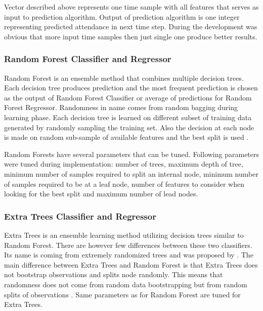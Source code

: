 \documentclass{article}
\begin{document}
Vector described above represents one time sample with all features that serves as input to prediction algorithm. Output of prediction algorithm is one integer representing predicted attendance in next time step. During the development was obvious that more input time samples then just single one produce better results. 

\subsubsection{Random Forest Classifier and Regressor}
Random Forest is an ensemble method that combines multiple decision trees. Each decision tree produces prediction and the most frequent prediction is chosen as the output of Random Forest Classifier or average of predictions for Random Forest Regressor. Randomness in name comes from random bagging during learning phase. Each decision tree is learned on different subset of training data generated by randomly sampling the training set. Also the decision at each node is made on random sub-sample of available features and the best split is used \citep{yiu2019randomforest} \citep{wiki2019randomforest}.

Random Forests have several parameters that can be tuned. Following parameters were tuned during implementation: number of trees, maximum depth of tree, minimum number of samples required to split an internal node, minimum number of samples required to be at a leaf node, number of features to consider when looking for the best split and maximum number of lead nodes. 

\subsubsection{Extra Trees Classifier and Regressor}
Extra Trees is an ensemble learning method utilizing decision trees similar to Random Forest. There are however few differences between these two classifiers. Its name is coming from extremely randomized trees and was proposed by \citep{geurts206extratree}. The main difference between Extra Trees and Random Forest is that Extra Trees does not bootstrap observations and splits node randomly. This means that randomness does not come from random data bootstrapping but from random splits of observations \citep{bhandari2019extratree}. Same parameters as for Random Forest are tuned for Extra Trees.
\end{document}
